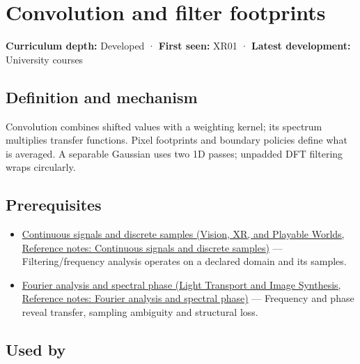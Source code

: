 \hypertarget{appendix-d5b3c692d9f0}{}\label{referencestart:appendix-d5b3c692d9f0}
\section{Convolution and filter footprints}\label{appendix-d5b3c692d9f0-convolution-and-filter-footprints}

\textbf{Curriculum depth:} Developed · \textbf{First seen:} XR01 · \textbf{Latest development:} University courses

\begin{allmightroledefinition}

\subsection{Definition and mechanism}\label{appendix-d5b3c692d9f0-definition-and-mechanism}

Convolution combines shifted values with a weighting kernel; its spectrum multiplies transfer functions. Pixel footprints and boundary policies define what is averaged. A separable Gaussian uses two 1D passes; unpadded DFT filtering wraps circularly.

\end{allmightroledefinition}

\subsection{Prerequisites}\label{appendix-d5b3c692d9f0-prerequisites}

\begin{itemize}
\tightlist
\item
  \href{../07-Vision-XR-and-Playable-Worlds/main.pdf\#nameddest=appendix-1077ea8fc737}{Continuous signals and discrete samples (Vision, XR, and Playable Worlds, Reference notes: Continuous signals and discrete samples)} --- Filtering/frequency analysis operates on a declared domain and its samples.
\item
  \href{../04-Light-Transport-and-Image-Synthesis/main.pdf\#nameddest=appendix-b60686ba06a1}{Fourier analysis and spectral phase (Light Transport and Image Synthesis, Reference notes: Fourier analysis and spectral phase)} --- Frequency and phase reveal transfer, sampling ambiguity and structural loss.
\end{itemize}

\subsection{Used by}\label{appendix-d5b3c692d9f0-used-by}

